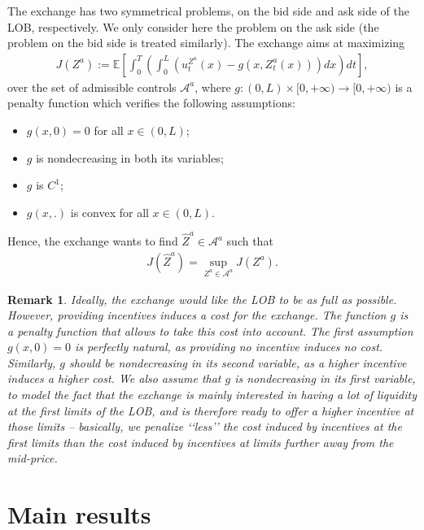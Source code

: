 \documentclass[11pt]{article}
\newtheorem{rem}{Remark}
\begin{document}
The exchange has two symmetrical problems, on the bid side and ask side of the LOB, respectively. We only consider here the problem on the ask side (the problem on the bid side is treated similarly). The exchange aims at maximizing
\begin{align*}
    J(Z^a) := \mathbb E \left[ \int_0^T \left( \int_0^L \left(u^{Z^a}_t(x) - g(x,Z^a_t(x)) \right) dx \right)dt \right],
\end{align*}
over the set of admissible controls $\mathcal A^a$, where $g:(0,L) \times [0,+\infty) \rightarrow [0,+\infty)$ is a penalty function which verifies the following assumptions:
\begin{itemize}
    \item $g(x,0) = 0$ for all $x \in (0,L)$;
    \item $g$ is nondecreasing in both its variables;
    \item $g$ is $C^1$;
    \item $g(x,.)$ is convex for all $x \in (0,L)$.
\end{itemize}

Hence, the exchange wants to find $\hat Z^a \in \mathcal A^a$ such that
\begin{align}\label{askPB}
J(\hat Z^a) = \underset{Z^a \in \mathcal A^a}{\sup} J(Z^a). 
\end{align}

\begin{rem}
Ideally, the exchange would like the LOB to be as full as possible. However, providing incentives induces a cost for the exchange. The function $g$ is a penalty function that allows to take this cost into account. The first assumption $g(x,0) = 0$ is perfectly natural,  as providing no incentive induces no cost. Similarly, $g$ should be nondecreasing in its second variable, as a higher incentive induces a higher cost. We also assume that $g$ is nondecreasing in its first variable, to model the fact that the exchange is mainly interested in having a lot of liquidity at the first limits of the LOB, and is therefore ready to offer a higher incentive at those limits -- basically, we penalize ‘‘less’’ the cost induced by incentives at the first limits than the cost induced by incentives at limits further away from the mid-price.
\end{rem}

\section{Main results}\label{sec_mainresult}
\end{document}

